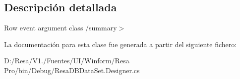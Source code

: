 \subsection{Descripción detallada}
Row event argument class /summary$>$ 

La documentación para esta clase fue generada a partir del siguiente fichero\+:\begin{DoxyCompactItemize}
\item 
D\+:/\+Resa/\+V1./\+Fuentes/\+U\+I/\+Winform/\+Resa Pro/bin/\+Debug/Resa\+D\+B\+Data\+Set.\+Designer.\+cs\end{DoxyCompactItemize}

